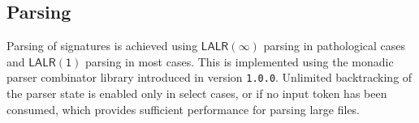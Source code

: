 
\subsection{Parsing}

Parsing of \Beluga signatures is achieved using $ \mathsf{LALR(\infty)} $ parsing in pathological cases and $ \mathsf{LALR(1)} $ parsing in most cases.
This is implemented using the monadic parser combinator library introduced in \Beluga version \texttt{1.0.0}.
Unlimited backtracking of the parser state is enabled only in select cases, or if no input token has been consumed, which provides sufficient performance for parsing large \Beluga files.


